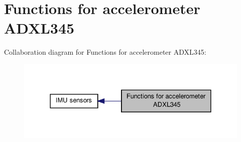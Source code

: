 \hypertarget{group__acc}{\section{Functions for accelerometer A\-D\-X\-L345}
\label{group__acc}
}
Collaboration diagram for Functions for accelerometer A\-D\-X\-L345\-:
\nopagebreak
\begin{figure}[H]
\begin{center}
\leavevmode
\includegraphics[width=328pt]{group__acc}
\end{center}
\end{figure}

